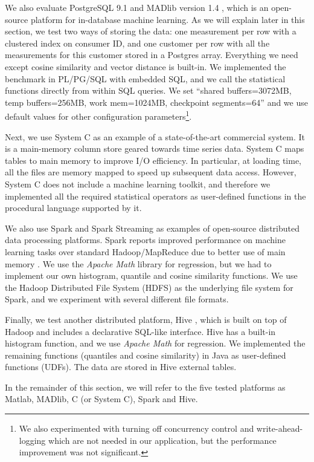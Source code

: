 \documentclass[prodmode,acmtods]{acmsmall}
\begin{document}
We also evaluate PostgreSQL 9.1 and MADlib version 1.4 \cite{madlibpaper}, which is an open-source platform for in-database machine learning.  As we will explain later in this section, we test two ways of storing the data: one measurement per row with a clustered index on consumer ID, and one customer per row with all the measurements for this customer stored in a Postgres array.  Everything we need except cosine similarity and vector distance is built-in.  We implemented the benchmark in PL/PG/SQL with embedded SQL, and we call the statistical functions directly from within SQL queries.  We set ``shared buffers=3072MB, temp buffers=256MB, work mem=1024MB, checkpoint segments=64'' and we use default values for other configuration parameters\footnote{We also experimented with turning off concurrency control and write-ahead-logging which are not needed in our application, but the performance improvement was not significant.}.

Next, we use System C as an example of a state-of-the-art commercial system.  It is a main-memory column store geared towards time series data.  System C maps tables to main memory to improve I/O efficiency. In particular, at loading time, all the files are memory mapped to speed up subsequent data access.  However, System C does not include a machine learning toolkit, and therefore we implemented all the required statistical operators as user-defined functions in the procedural language supported by it.

We also use Spark \cite{zaharia2010} and Spark Streaming \cite{zdl+12} as examples of open-source distributed data processing platforms.  Spark reports improved performance on machine learning tasks over standard Hadoop/MapReduce due to better use of main memory \cite{zaharia2010}.  We use the {\em Apache Math} library for regression, but we had to implement our own histogram, quantile and cosine similarity functions.  We use the Hadoop Distributed File System (HDFS) as the underlying file system for Spark, and we experiment with several different file formats.

Finally, we test another distributed platform, Hive \cite{hive}, which is built on top of Hadoop and includes a declarative SQL-like interface.  Hive has a built-in histogram function, and we use {\em Apache Math} for regression.  We implemented the remaining functions (quantiles and cosine similarity) in Java as user-defined functions (UDFs).  The data are stored in Hive external tables.

In the remainder of this section, we will refer to the five tested platforms as Matlab, MADlib, C (or System C), Spark and Hive.
\end{document}
